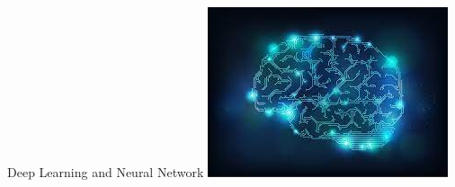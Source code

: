 \documentclass{beamer}
\begin{document}
{
\begin{frame}{Deep Learning and Neural Network}
	\centering
	\includegraphics[width=\linewidth]{deepll.jpeg}
\end{frame}
}
\end{document}
